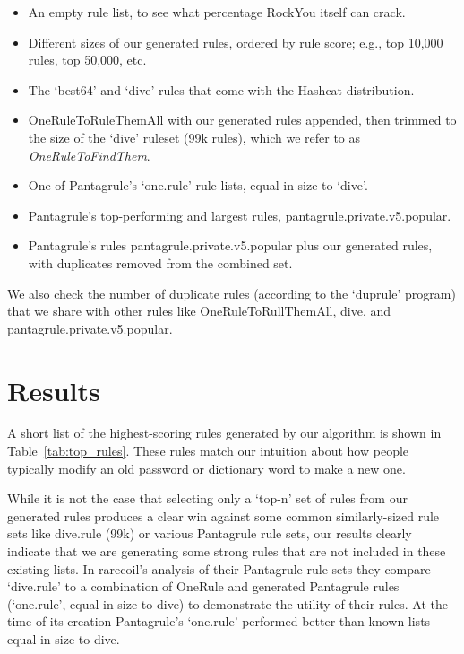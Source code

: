 \documentclass[letterpaper,twocolumn,10pt]{article}
\begin{document}
\begin{itemize}
\item An empty rule list, to see what percentage RockYou itself can crack.
\item Different sizes of our generated rules, ordered by rule score; e.g., top
10,000 rules, top 50,000, etc.
\item The `best64' and `dive' rules that come with the Hashcat distribution.
\item OneRuleToRuleThemAll with our generated rules appended, then trimmed to the size of the `dive' ruleset (99k rules), which we refer to as \textit{OneRuleToFindThem}.
\item One of Pantagrule's `one.rule' rule lists, equal in size to `dive'.
\item Pantagrule's top-performing and largest rules, pantagrule.private.v5.popular.
\item Pantagrule's rules pantagrule.private.v5.popular plus our generated rules, with duplicates removed from the combined set.
\end{itemize}

We also check the number of duplicate rules (according to the `duprule' program) that we share with other rules like OneRuleToRullThemAll, dive, and pantagrule.private.v5.popular.

\section{Results}
\label{sec:results}

A short list of the highest-scoring rules generated by our algorithm is shown
in Table~\ref{tab:top_rules}. These rules match our intuition about how people
typically modify an old password or dictionary word to make a new one.

While it is not the case that selecting only a `top-n' set of rules from our
generated rules produces a clear win against some common similarly-sized
rule sets like dive.rule (99k) or various Pantagrule rule sets, our results
clearly indicate that we are generating some strong rules that are not included
in these existing lists. In rarecoil's analysis of their Pantagrule rule sets
they compare `dive.rule' to a combination of OneRule and generated Pantagrule
rules (`one.rule', equal in size to dive) to demonstrate the utility of their
rules. At the time of its creation Pantagrule's `one.rule' performed better than
known lists equal in size to dive.
\end{document}
